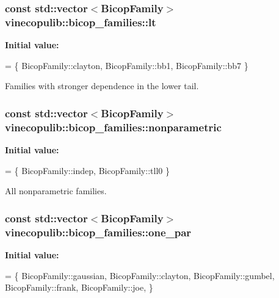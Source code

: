 \hypertarget{namespacevinecopulib_1_1bicop__families_a5a5f349f07638768ff8b1bb2ae90d102}{
\subsubsection[{lt}]{\setlength{\rightskip}{0pt plus 5cm}const std\+::vector$<${\bf Bicop\+Family}$>$ vinecopulib\+::bicop\+\_\+families\+::lt}}\label{namespacevinecopulib_1_1bicop__families_a5a5f349f07638768ff8b1bb2ae90d102}
{\bfseries Initial value\+:}
\begin{DoxyCode}
= \{
            BicopFamily::clayton, 
            BicopFamily::bb1, 
            BicopFamily::bb7
        \}
\end{DoxyCode}


Families with stronger dependence in the lower tail. 

\hypertarget{namespacevinecopulib_1_1bicop__families_a01c7c990cc34b1b74d115858a52fcdc5}{
\subsubsection[{nonparametric}]{\setlength{\rightskip}{0pt plus 5cm}const std\+::vector$<${\bf Bicop\+Family}$>$ vinecopulib\+::bicop\+\_\+families\+::nonparametric}}\label{namespacevinecopulib_1_1bicop__families_a01c7c990cc34b1b74d115858a52fcdc5}
{\bfseries Initial value\+:}
\begin{DoxyCode}
= \{
            BicopFamily::indep,
            BicopFamily::tll0
        \}
\end{DoxyCode}


All nonparametric families. 

\hypertarget{namespacevinecopulib_1_1bicop__families_aba503484b0a13cfb0e67c026e2f295d4}{
\subsubsection[{one\+\_\+par}]{\setlength{\rightskip}{0pt plus 5cm}const std\+::vector$<${\bf Bicop\+Family}$>$ vinecopulib\+::bicop\+\_\+families\+::one\+\_\+par}}\label{namespacevinecopulib_1_1bicop__families_aba503484b0a13cfb0e67c026e2f295d4}
{\bfseries Initial value\+:}
\begin{DoxyCode}
= \{
            BicopFamily::gaussian,
            BicopFamily::clayton,
            BicopFamily::gumbel,
            BicopFamily::frank,
            BicopFamily::joe,
        \}
\end{DoxyCode}


